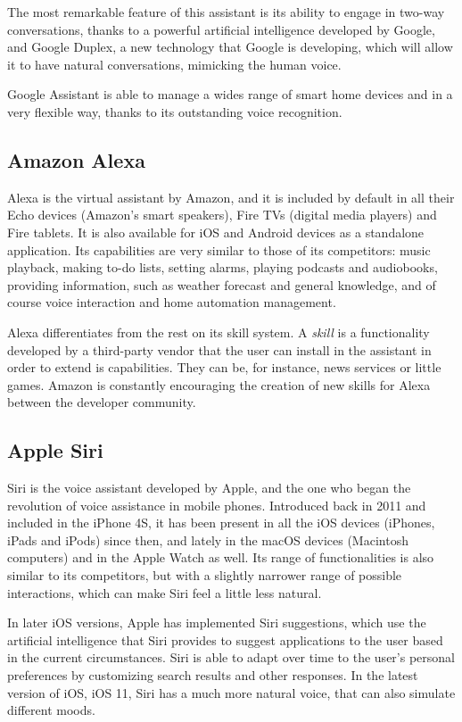 The most remarkable feature of this assistant is its ability to engage in two-way conversations, thanks to a powerful artificial intelligence
developed by Google, and Google Duplex, a new technology that Google is developing, which will allow it to have natural conversations,
mimicking the human voice.

Google Assistant is able to manage a wides range of smart home devices and in a very flexible way, thanks to its outstanding voice 
recognition.

\subsection{Amazon Alexa}
Alexa is the virtual assistant by Amazon, and it is included by default in all their Echo devices (Amazon's smart speakers), Fire TVs
(digital media players) and Fire tablets. It is also available for iOS and Android devices as a standalone application. Its capabilities are
very similar to those of its competitors: music playback, making to-do lists, setting alarms, playing podcasts and audiobooks, providing 
information, such as weather forecast and general knowledge, and of course voice interaction and home automation management.

Alexa differentiates from the rest on its skill system. A \textit{skill} is a functionality developed by a third-party vendor that the user
can install in the assistant in order to extend is capabilities. They can be, for instance, news services or little games. Amazon is 
constantly encouraging the creation of new skills for Alexa between the developer community.\cite{amazonAlexa}

\subsection{Apple Siri}
Siri is the voice assistant developed by Apple, and the one who began the revolution of voice assistance in mobile phones. Introduced
back in 2011 and included in the iPhone 4S, it has been present in all the iOS devices (iPhones, iPads and iPods) since then, and lately
in the macOS devices (Macintosh computers) and in the Apple Watch as well.\cite{appleIOSSiri} Its range of functionalities is also 
similar to its competitors, but with a slightly narrower range of possible interactions, which can make Siri feel a little less natural.

In later iOS versions, Apple has implemented Siri suggestions, which use the artificial intelligence that Siri provides to suggest 
applications to the user based in the current circumstances. Siri is able to adapt over time to the user's personal preferences by 
customizing search results and other responses. In the latest version of iOS, iOS 11, Siri has a much more natural voice, that can
also simulate different moods.

